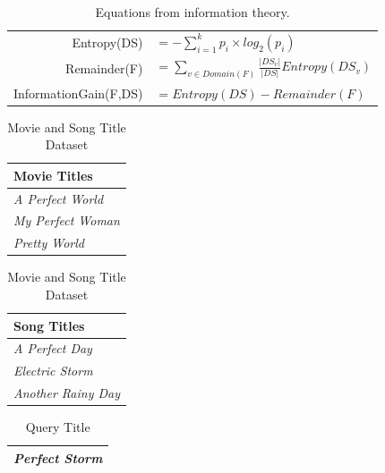 \documentclass[solution]{ditpaper}
\begin{document}
	\begin{table}[htb]
	\begin{center}
	\begin{tabular}{rl}
	Entropy(DS) & $= -\sum_{i=1}^k p_i \times log_2(p_i)$\\
	Remainder(F) & $=\sum_{v \in Domain(F)} \frac{|DS_v|}{|DS|} Entropy(DS_v)$\\
	InformationGain(F,DS) & $=Entropy(DS)-Remainder(F)$\\
	\end{tabular}
	\end{center}
	\caption{Equations from information theory.}
	\label{tab:info-eqs}
	\end{table}
\newpage
	
\begin{table}[!htb]
    \caption{Movie and Song Title Dataset}
    \begin{minipage}{.5\linewidth}
      \centering
\begin{tabular}{l}
\textbf{Movie Titles}\\
\hline
\textit{A Perfect World}\\
\textit{My Perfect Woman}\\
\textit{Pretty World}\\
\hline
\end{tabular}
    \end{minipage}%
    \begin{minipage}{.5\linewidth}
      \centering
\begin{tabular}{l}
\textbf{Song Titles}\\
\hline
\textit{A Perfect Day}\\
\textit{Electric Storm}\\
\textit{Another Rainy Day}\\
\hline
\end{tabular}
    \end{minipage} 
    \label{tab:songmoviedata}
\end{table}

\begin{table}[h]
\caption{Query Title}
\centering
\begin{tabular}{l}
\hline
\textit{Perfect Storm}\\
\hline
\end{tabular}
\label{tab:songmoviequery}
\end{table}
\end{document}
